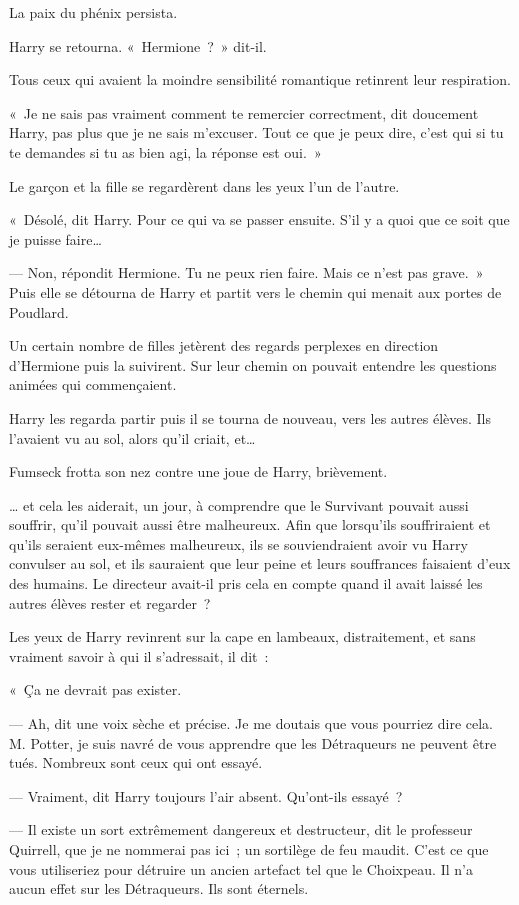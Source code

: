 La paix du phénix persista.

Harry se retourna. «~Hermione~?~» dit-il.

Tous ceux qui avaient la moindre sensibilité romantique retinrent leur respiration.

«~Je ne sais pas vraiment comment te remercier correctment, dit doucement Harry, pas plus que je ne sais m'excuser. Tout ce que je peux dire, c'est qui si tu te demandes si tu as bien agi, la réponse est oui.~»

Le garçon et la fille se regardèrent dans les yeux l'un de l'autre.

«~Désolé, dit Harry. Pour ce qui va se passer ensuite. S'il y a quoi que ce soit que je puisse faire…

--- Non, répondit Hermione. Tu ne peux rien faire. Mais ce n'est pas grave.~» Puis elle se détourna de Harry et partit vers le chemin qui menait aux portes de Poudlard.

Un certain nombre de filles jetèrent des regards perplexes en direction d'Hermione puis la suivirent. Sur leur chemin on pouvait entendre les questions animées qui commençaient.

Harry les regarda partir puis il se tourna de nouveau, vers les autres élèves. Ils l'avaient vu au sol, alors qu'il criait, et…

Fumseck frotta son nez contre une joue de Harry, brièvement.

… et cela les aiderait, un jour, à comprendre que le Survivant pouvait aussi souffrir, qu'il pouvait aussi être malheureux. Afin que lorsqu'ils souffriraient et qu'ils seraient eux-mêmes malheureux, ils se souviendraient avoir vu Harry convulser au sol, et ils sauraient que leur peine et leurs souffrances faisaient d'eux des humains. Le directeur avait-il pris cela en compte quand il avait laissé les autres élèves rester et regarder~?

Les yeux de Harry revinrent sur la cape en lambeaux, distraitement, et sans vraiment savoir à qui il s'adressait, il dit~:

«~Ça ne devrait pas exister.

--- Ah, dit une voix sèche et précise. Je me doutais que vous pourriez dire cela. M. Potter, je suis navré de vous apprendre que les Détraqueurs ne peuvent être tués. Nombreux sont ceux qui ont essayé.

--- Vraiment, dit Harry toujours l'air absent. Qu'ont-ils essayé~?

--- Il existe un sort extrêmement dangereux et destructeur, dit le professeur Quirrell, que je ne nommerai pas ici~; un sortilège de feu maudit. C'est ce que vous utiliseriez pour détruire un ancien artefact tel que le Choixpeau. Il n'a aucun effet sur les Détraqueurs. Ils sont éternels.

